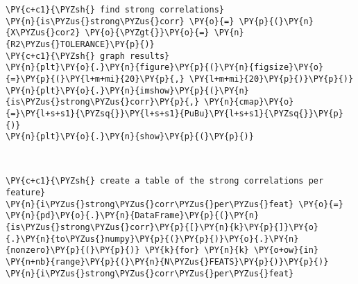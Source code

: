     \begin{tcolorbox}[breakable, size=fbox, boxrule=1pt, pad at break*=1mm,colback=cellbackground, colframe=cellborder]
\begin{Verbatim}[commandchars=\\\{\}]
\PY{c+c1}{\PYZsh{} find strong correlations}
\PY{n}{is\PYZus{}strong\PYZus{}corr} \PY{o}{=} \PY{p}{(}\PY{n}{X\PYZus{}cor2} \PY{o}{\PYZgt{}}\PY{o}{=} \PY{n}{R2\PYZus{}TOLERANCE}\PY{p}{)}
\PY{c+c1}{\PYZsh{} graph results}
\PY{n}{plt}\PY{o}{.}\PY{n}{figure}\PY{p}{(}\PY{n}{figsize}\PY{o}{=}\PY{p}{(}\PY{l+m+mi}{20}\PY{p}{,} \PY{l+m+mi}{20}\PY{p}{)}\PY{p}{)}
\PY{n}{plt}\PY{o}{.}\PY{n}{imshow}\PY{p}{(}\PY{n}{is\PYZus{}strong\PYZus{}corr}\PY{p}{,} \PY{n}{cmap}\PY{o}{=}\PY{l+s+s1}{\PYZsq{}}\PY{l+s+s1}{PuBu}\PY{l+s+s1}{\PYZsq{}}\PY{p}{)}
\PY{n}{plt}\PY{o}{.}\PY{n}{show}\PY{p}{(}\PY{p}{)}
\end{Verbatim}
\end{tcolorbox}

    \begin{center}
    \end{center}
    { \hspace*{\fill} \\}
    
    \begin{tcolorbox}[breakable, size=fbox, boxrule=1pt, pad at break*=1mm,colback=cellbackground, colframe=cellborder]
\begin{Verbatim}[commandchars=\\\{\}]
\PY{c+c1}{\PYZsh{} create a table of the strong correlations per feature}
\PY{n}{i\PYZus{}strong\PYZus{}corr\PYZus{}per\PYZus{}feat} \PY{o}{=} \PY{n}{pd}\PY{o}{.}\PY{n}{DataFrame}\PY{p}{(}\PY{n}{is\PYZus{}strong\PYZus{}corr}\PY{p}{[}\PY{n}{k}\PY{p}{]}\PY{o}{.}\PY{n}{to\PYZus{}numpy}\PY{p}{(}\PY{p}{)}\PY{o}{.}\PY{n}{nonzero}\PY{p}{(}\PY{p}{)} \PY{k}{for} \PY{n}{k} \PY{o+ow}{in} \PY{n+nb}{range}\PY{p}{(}\PY{n}{N\PYZus{}FEATS}\PY{p}{)}\PY{p}{)}
\PY{n}{i\PYZus{}strong\PYZus{}corr\PYZus{}per\PYZus{}feat}
\end{Verbatim}
\end{tcolorbox}

